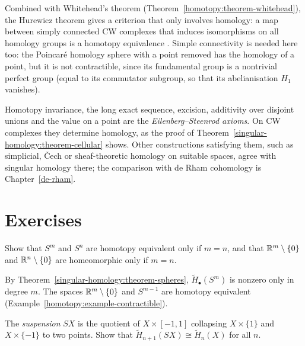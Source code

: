 \begin{remark}\label{singular-homology:remark-homology-whitehead}
Combined with Whitehead's theorem (Theorem~\ref{homotopy:theorem-whitehead}), the Hurewicz theorem gives a criterion that only involves homology: a map between simply connected CW complexes that
induces isomorphisms on all homology groups is a homotopy equivalence \cite[Corollary 4.33]{hatcher-at}. Simple connectivity is needed here too: the Poincar\'e homology sphere with a point
removed has the homology of a point, but it is not contractible, since its fundamental group is a nontrivial perfect group (equal to its commutator subgroup, so that its abelianisation $H_1$
vanishes).
\end{remark}

\begin{remark}\label{singular-homology:remark-eilenberg-steenrod}
Homotopy invariance, the long exact sequence, excision, additivity over disjoint unions and the value on a point are the \emph{Eilenberg--Steenrod axioms}. On
CW complexes they determine homology, as the proof of Theorem~\ref{singular-homology:theorem-cellular} shows. Other constructions satisfying them, such as
simplicial, \v{C}ech or sheaf-theoretic homology on suitable spaces, agree with singular homology there; the comparison with de Rham cohomology is
Chapter~\ref{de-rham}.
\end{remark}

\section{Exercises}\label{singular-homology:section-exercises}

\begin{exercise}\label{singular-homology:exercise-spheres-not-equivalent}
Show that $S^m$ and $S^n$ are homotopy equivalent only if $m = n$, and that $\mathbb{R}^m \setminus \{0\}$ and $\mathbb{R}^n \setminus \{0\}$ are homeomorphic only if $m = n$.
\end{exercise}

\begin{solution}
By Theorem~\ref{singular-homology:theorem-spheres}, $\tilde{H}_\bullet(S^m)$ is nonzero only in degree $m$. The spaces $\mathbb{R}^m \setminus \{0\}$ and $S^{m-1}$ are homotopy equivalent
(Example~\ref{homotopy:example-contractible}).
\end{solution}

\begin{exercise}\label{singular-homology:exercise-suspension}
The \emph{suspension} $SX$ is the quotient of $X \times [-1, 1]$ collapsing $X \times \{1\}$ and $X \times \{-1\}$ to two points. Show that $\tilde{H}_{n+1}(SX) \cong \tilde{H}_n(X)$ for
all $n$.
\end{exercise}

